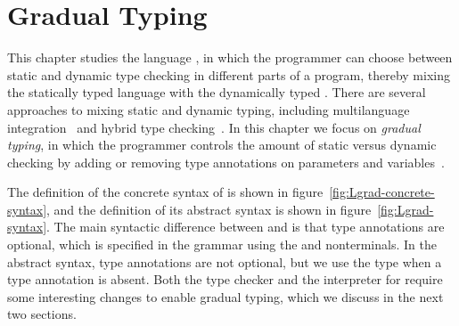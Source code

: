 \documentclass[7x10]{TimesAPriori_MIT}%
\numberwithin{theorem}{chapter}
\numberwithin{definition}{chapter}
\numberwithin{equation}{chapter}
\begin{document}


\chapter{Gradual Typing}
\label{ch:Lgrad}
\setcounter{footnote}{0}

This chapter studies the language \LangGrad{}, in which the programmer
can choose between static and dynamic type checking in different parts
of a program, thereby mixing the statically typed \LangLam{} language
with the dynamically typed \LangDyn{}. There are several approaches to
mixing static and dynamic typing, including multilanguage
integration~\citep{Tobin-Hochstadt:2006fk,Matthews:2007zr} and hybrid
type checking~\citep{Flanagan:2006mn,Gronski:2006uq}. In this chapter
we focus on \emph{gradual typing}, in which the
programmer controls the amount of static versus dynamic checking by
adding or removing type annotations on parameters and
variables~\citep{Anderson:2002kd,Siek:2006bh}.

The definition of the concrete syntax of \LangGrad{} is shown in
figure~\ref{fig:Lgrad-concrete-syntax}, and the definition of its
abstract syntax is shown in figure~\ref{fig:Lgrad-syntax}. The main
syntactic difference between \LangLam{} and \LangGrad{} is that type
annotations are optional, which is specified in the grammar using the
\Param{} and  nonterminals. In the abstract syntax, type
annotations are not optional, but we use the \CANYTY{} type when a type
annotation is absent.
%
Both the type checker and the interpreter for \LangGrad{} require some
interesting changes to enable gradual typing, which we discuss in the
next two sections.

\newcommand{\LgradGrammarRacket}{
\begin{array}{lcl}
  \Type &::=& \LP\Type \ldots \; \key{->}\; \Type\RP \\
  \Param &::=& \Var \MID \LS\Var \key{:} \Type\RS \\
  \itm{ret} &::=& \epsilon \MID \key{:} \Type \\
  \Exp &::=& \LP\Exp \; \Exp \ldots\RP 
      \MID \CGLAMBDA{\LP\Param\ldots\RP}{\itm{ret}}{\Exp} \\
    &\MID& \LP \key{procedure-arity}~\Exp\RP \\
  \Def &::=& \CGDEF{\Var}{\Param\ldots}{\itm{ret}}{\Exp} 
\end{array}
}
\end{document}
